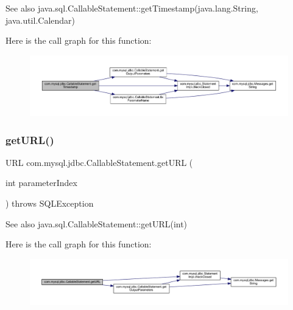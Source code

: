 \begin{DoxySeeAlso}{See also}
java.\+sql.\+Callable\+Statement\+::get\+Timestamp(java.\+lang.\+String, java.\+util.\+Calendar) 
\end{DoxySeeAlso}
Here is the call graph for this function\+:\nopagebreak
\begin{figure}[H]
\begin{center}
\leavevmode
\includegraphics[width=350pt]{classcom_1_1mysql_1_1jdbc_1_1_callable_statement_a85044e257c65d9ce314d9cdbee27a853_cgraph}
\end{center}
\end{figure}
\mbox{\label{classcom_1_1mysql_1_1jdbc_1_1_callable_statement_a945b80e68af80612f673fe4c483caad4}} 
\subsubsection{\texorpdfstring{get\+U\+R\+L()}{getURL()}\hspace{0.1cm}{\footnotesize\ttfamily [1/2]}}
{\footnotesize\ttfamily U\+RL com.\+mysql.\+jdbc.\+Callable\+Statement.\+get\+U\+RL (\begin{DoxyParamCaption}\item[{int}]{parameter\+Index }\end{DoxyParamCaption}) throws S\+Q\+L\+Exception}

\begin{DoxySeeAlso}{See also}
java.\+sql.\+Callable\+Statement\+::get\+U\+R\+L(int) 
\end{DoxySeeAlso}
Here is the call graph for this function\+:\nopagebreak
\begin{figure}[H]
\begin{center}
\leavevmode
\includegraphics[width=350pt]{classcom_1_1mysql_1_1jdbc_1_1_callable_statement_a945b80e68af80612f673fe4c483caad4_cgraph}
\end{center}
\end{figure}
\mbox{\label{classcom_1_1mysql_1_1jdbc_1_1_callable_statement_acd2ed833e20cc8a73e5723bde7bfb394}} 
